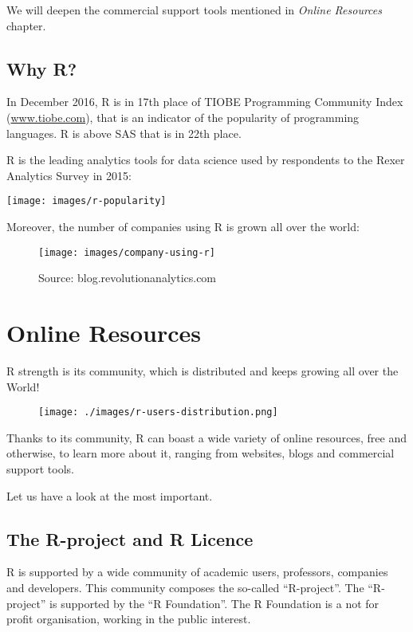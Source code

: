 \documentclass[]{book}
\begin{document}
We will deepen the commercial support tools mentioned in \emph{Online
Resources} chapter.

\section{Why R?}\label{why-r}

In December 2016, R is in 17th place of TIOBE Programming Community
Index (\href{http://www.tiobe.com/tiobe-index/}{www.tiobe.com}), that is
an indicator of the popularity of programming languages. R is above SAS
that is in 22th place.

R is the leading analytics tools for data science used by respondents to
the Rexer Analytics Survey in 2015:

\texttt{[image: images/r-popularity]}

Moreover, the number of companies using R is grown all over the world:

\begin{figure}
\texttt{[image: images/company-using-r]} \caption{Source: blog.revolutionanalytics.com}\label{fig:g6}
\end{figure}

\chapter{Online Resources}\label{online-resources}

R strength is its community, which is distributed and keeps growing all
over the World!

\begin{figure}[htbp]
\centering
\texttt{[image: ./images/r-users-distribution.png]}
\caption{}
\end{figure}

Thanks to its community, R can boast a wide variety of online resources,
free and otherwise, to learn more about it, ranging from websites, blogs
and commercial support tools.

Let us have a look at the most important.

\section{The R-project and R Licence}\label{the-r-project-and-r-licence}

R is supported by a wide community of academic users, professors,
companies and developers. This community composes the so-called
``R-project''. The ``R-project'' is supported by the ``R Foundation''.
The R Foundation is a not for profit organisation, working in the public
interest.
\end{document}

